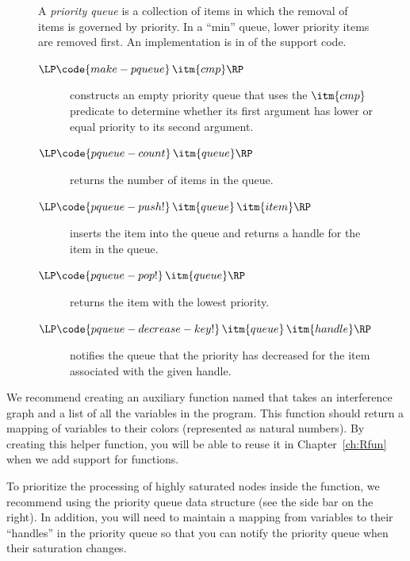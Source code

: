 \documentclass[11pt]{book}
\begin{document}
\begin{figure}
  \small
  \begin{tcolorbox}[title=Priority Queue]
    A \emph{priority queue} is a collection of items in which the
    removal of items is governed by priority. In a ``min'' queue,
    lower priority items are removed first. An implementation is in
     of the support code.   
  \begin{description}
  \item[$\LP\code{make-pqueue}\,\itm{cmp}\RP$] constructs an empty
    priority queue that uses the $\itm{cmp}$ predicate to determine
    whether its first argument has lower or equal priority to its
    second argument.
  \item[$\LP\code{pqueue-count}\,\itm{queue}\RP$] returns the number of
    items in the queue.
  \item[$\LP\code{pqueue-push!}\,\itm{queue}\,\itm{item}\RP$] inserts
    the item into the queue and returns a handle for the item in the
    queue.
  \item[$\LP\code{pqueue-pop!}\,\itm{queue}\RP$] returns the item with
    the lowest priority.
  \item[$\LP\code{pqueue-decrease-key!}\,\itm{queue}\,\itm{handle}\RP$]
    notifies the queue that the priority has decreased for the item
    associated with the given handle.
  \end{description}
\end{tcolorbox}
\end{figure}

We recommend creating an auxiliary function named 
that takes an interference graph and a list of all the variables in
the program. This function should return a mapping of variables to
their colors (represented as natural numbers). By creating this helper
function, you will be able to reuse it in Chapter~\ref{ch:Rfun}
when we add support for functions.

To prioritize the processing of highly saturated nodes inside the
 function, we recommend using the priority queue
data structure (see the side bar on the right). In addition, you will
need to maintain a mapping from variables to their ``handles'' in the
priority queue so that you can notify the priority queue when their
saturation changes.
\end{document}
